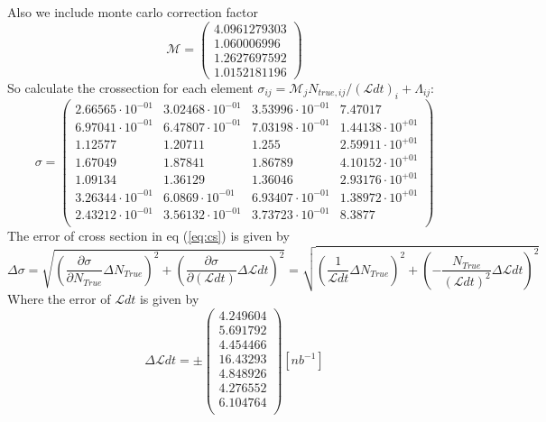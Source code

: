 \documentclass[]{article}
\begin{document}
Also we include monte carlo correction factor
\begin{equation}
\mathcal{M} = \begin{pmatrix}
  4.0961279303 \\
  1.060006996 \\
  1.2627697592 \\
  1.0152181196
\end{pmatrix}
\end{equation}
So calculate the crossection for each element $\sigma_{ij} = \mathcal{M}_{j}N_{true,ij}/(\mathcal{L}dt)_i+\Lambda_{ij}$:
\begin{equation}
\sigma = \begin{pmatrix}
   2.66565\cdot 10^{-01} & 3.02468\cdot 10^{-01} & 3.53996\cdot 10^{-01} & 7.47017 \\
   6.97041\cdot 10^{-01} & 6.47807\cdot 10^{-01} & 7.03198\cdot 10^{-01} & 1.44138\cdot 10^{+01} \\
   1.12577 & 1.20711 & 1.255 & 2.59911\cdot 10^{+01} \\
   1.67049 & 1.87841 & 1.86789 & 4.10152\cdot 10^{+01} \\
   1.09134 & 1.36129 & 1.36046 & 2.93176\cdot 10^{+01} \\
   3.26344\cdot 10^{-01} & 6.0869\cdot 10^{-01} & 6.93407\cdot 10^{-01} & 1.38972\cdot 10^{+01} \\
   2.43212\cdot 10^{-01} & 3.56132\cdot 10^{-01} & 3.73723\cdot 10^{-01} & 8.3877 \\
\end{pmatrix}
\end{equation}
The error of cross section in eq (\ref{eq:cs}) is given by
\begin{equation}
\Delta\sigma = \sqrt{\left(\frac{\partial\sigma}{\partial N_{True}}\Delta N_{True}\right)^2+
\left(\frac{\partial\sigma}{\partial (\mathcal{L}dt)}\Delta{\mathcal{L}dt}\right)^2} = \sqrt{\left(\frac{1}{\mathcal{L}dt}\Delta N_{True}\right)^2
+\left(-\frac{N_{True}}{(\mathcal{L}dt)^2}\Delta\mathcal{L}dt\right)^2}
\end{equation}
Where the error of $\mathcal{L}dt$ is given by
\begin{equation}
\Delta\mathcal{L}dt = \pm \begin{pmatrix}
   4.249604 \\
   5.691792 \\
   4.454466 \\
   16.43293 \\
   4.848926 \\
   4.276552 \\
   6.104764 \\
\end{pmatrix} [nb^{-1}]
\end{equation}
\end{document}
